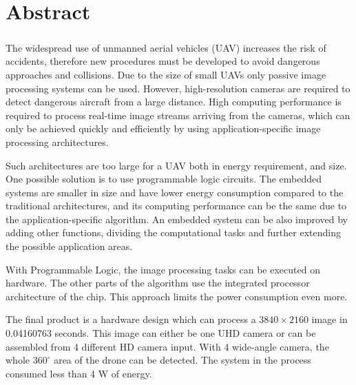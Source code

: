 \chapter*{Abstract}
\paragraph{}
The widespread use of unmanned aerial vehicles (UAV) increases the risk of accidents, therefore new procedures must be developed to avoid dangerous approaches and collisions.
Due to the size of small UAVs only passive image processing systems can be used.
However, high-resolution cameras are required to detect dangerous aircraft from a large distance.
High computing performance is required to process real-time image streams arriving from the cameras, which can only be achieved quickly and efficiently by using application-specific image processing architectures.

Such architectures are too large for a UAV both in energy requirement, and size.
One possible solution is to use programmable logic circuits.
The embedded systems are smaller in size and have lower energy consumption compared to the traditional architectures, and its computing performance can be the same due to the application-specific algorithm. 
An embedded system can be also improved by adding other functions, dividing the computational tasks and further extending the possible application areas.

With Programmable Logic, the image processing tasks can be executed on hardware.
The other parts of the algorithm use the integrated processor architecture of the chip.
This approach limits the power consumption even more.

The final product is a hardware design which can process a $3840 \times 2160$ image in 0.04160763 seconds.
This image can either be one UHD camera or can be assembled from 4 different HD camera input.
With 4 wide-angle camera, the whole $360^\circ$ area of the drone can be detected.
The system in the process consumed less than 4 W of energy.

\clearpage